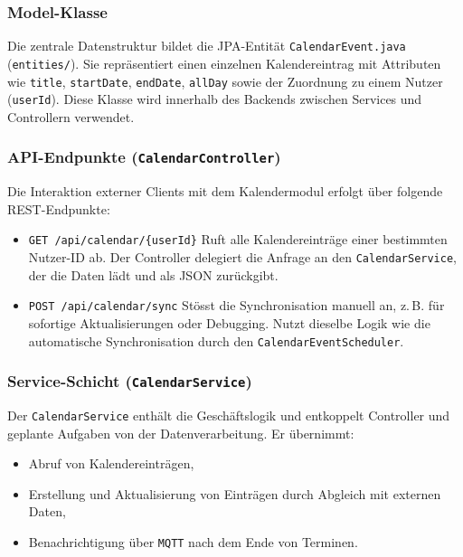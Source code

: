 \documentclass[12pt,a4paper]{report}
\begin{document}
    \subsubsection{Model-Klasse}
        Die zentrale Datenstruktur bildet die JPA-Entität \texttt{CalendarEvent.java} (\texttt{entities/}).
        Sie repräsentiert einen einzelnen Kalendereintrag mit Attributen wie \texttt{title}, \texttt{startDate}, \texttt{endDate}, \texttt{allDay} sowie der Zuordnung zu einem Nutzer (\texttt{userId}).
        Diese Klasse wird innerhalb des Backends zwischen Services und Controllern verwendet.

    \subsubsection{API-Endpunkte (\texttt{CalendarController})}
        Die Interaktion externer Clients mit dem Kalendermodul erfolgt über folgende REST-Endpunkte:
        \begin{itemize}
            \item \texttt{GET /api/calendar/\{userId\}}
                Ruft alle Kalendereinträge einer bestimmten Nutzer-ID ab.
                Der Controller delegiert die Anfrage an den \texttt{CalendarService}, der die Daten lädt und als JSON zurückgibt.
            \item \texttt{POST /api/calendar/sync}
                Stösst die Synchronisation manuell an, z.\,B. für sofortige Aktualisierungen oder Debugging.
                Nutzt dieselbe Logik wie die automatische Synchronisation durch den \texttt{CalendarEventScheduler}.
        \end{itemize}

    \subsubsection{Service-Schicht (\texttt{CalendarService})}
        Der \texttt{CalendarService} enthält die Geschäftslogik und entkoppelt Controller und geplante Aufgaben von der Datenverarbeitung.
        Er übernimmt:
        \begin{itemize}
            \item Abruf von Kalendereinträgen,
            \item Erstellung und Aktualisierung von Einträgen durch Abgleich mit externen Daten,
            \item Benachrichtigung über \texttt{MQTT} nach dem Ende von Terminen.
        \end{itemize}
\end{document}
